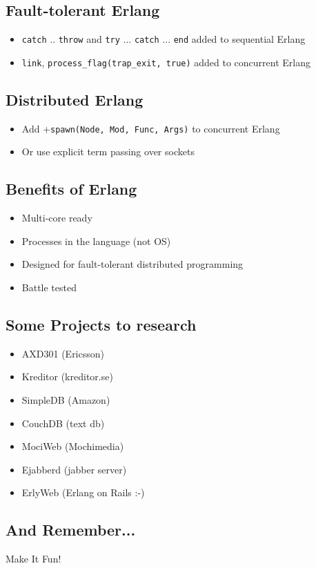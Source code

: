 \documentclass[12pt]{article}
\begin{document}
\subsection{Fault-tolerant Erlang}

\begin{itemize}
\item \verb+catch+ .. \verb+throw+ and \verb+try+ ... \verb+catch+ ... \verb+end+ added to sequential Erlang
\item \verb+link+, \verb+process_flag(trap_exit, true)+ added to concurrent Erlang
\end{itemize}

\subsection{Distributed Erlang}
\begin{itemize}
\item Add +\verb+spawn(Node, Mod, Func, Args)+ to concurrent Erlang
\item  Or use explicit term passing over sockets
\end{itemize}

\subsection{Benefits of Erlang}
\begin{itemize}
\item Multi-core ready
\item Processes in the language (not OS)
\item Designed for fault-tolerant distributed programming
\item Battle tested
\end{itemize}

\subsection{Some Projects to research}
\begin{itemize}
\item AXD301 (Ericsson)
\item Kreditor (kreditor.se)
\item SimpleDB (Amazon)
\item CouchDB (text db)
\item MociWeb (Mochimedia)
\item Ejabberd (jabber server)
\item ErlyWeb (Erlang on Rails :-)
\end{itemize}

\subsection{And Remember...}

Make It Fun!
\end{document}
